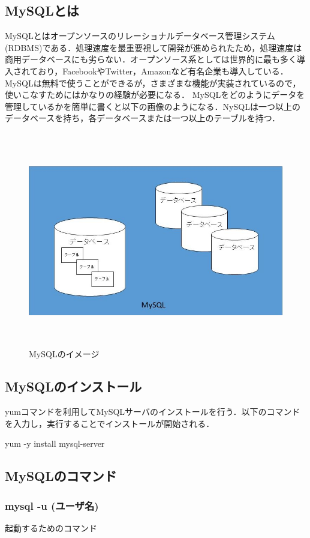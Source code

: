 \subsection{MySQLとは}
MySQLとはオープンソースのリレーショナルデータベース管理システム(RDBMS)である．処理速度を最重要視して開発が進められたため，処理速度は商用データベースにも劣らない．オープンソース系としては世界的に最も多く導入されており，FacebookやTwitter，Amazonなど有名企業も導入している．
MySQLは無料で使うことができるが，さまざまな機能が実装されているので，使いこなすためにはかなりの経験が必要になる．
MySQLをどのようにデータを管理しているかを簡単に書くと以下の画像のようになる．NySQLは一つ以上のデータベースを持ち，各データベースまたは一つ以上のテーブルを持つ．\cite{mysql}

\begin{figure}[htb]
\centering　
\includegraphics[height=8.5cm,width=13cm]{mysqltoha.JPG}
\caption{MySQLのイメージ}
\end{figure}


\subsection{MySQLのインストール}
yumコマンドを利用してMySQLサーバのインストールを行う．以下のコマンドを入力し，実行することでインストールが開始される．

yum -y install mysql-server

\newpage

\subsection{MySQLのコマンド}

\subsubsection{mysql -u (ユーザ名)}
起動するためのコマンド

